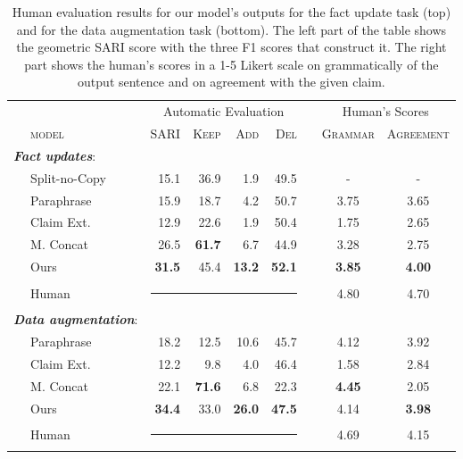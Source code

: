\documentclass[letterpaper]{article}
\begin{document}
\begin{table}[t]
\small
\centering
\begin{tabular}{llrrrrccc}
\toprule
& & \multicolumn{4}{c}{Automatic Evaluation} & & \multicolumn{2}{c}{Human's Scores}\\
\cmidrule(lr){3-6}\cmidrule(lr){8-9}
&\textsc{model}              & \textsc{SARI} & \textsc{Keep} & \textsc{Add} & \textsc{Del} & & \textsc{Grammar} & \textsc{Agreement} \\
\midrule
\multicolumn{2}{l}{\textit{\textbf{Fact updates}}:} &\\
&Split-no-Copy & 15.1 & 36.9 & 1.9 & 49.5 && - & -\\
&Paraphrase & 15.9 & 18.7 & 4.2 & 50.7 & & 3.75 & 3.65 \\
&Claim Ext.    & 12.9 & 22.6       & 1.9      & 50.4 & & 1.75 & 2.65     \\
&M. Concat     & 26.5 & \textbf{61.7}      & 6.7      & 44.9  & & 3.28 & 2.75 \\
&Ours & \textbf{31.5} & 45.4      & \textbf{13.2}      & \textbf{52.1}  & & \textbf{3.85} & \textbf{4.00} \\
&Human &\multicolumn{4}{r}{\rule[0.09cm]{4cm}{0.01cm}} & & 4.80 & 4.70 \\
\midrule

\multicolumn{2}{l}{\textit{\textbf{Data augmentation}}:} &\\
&Paraphrase & 18.2 & 12.5 & 10.6 & 45.7 & & 4.12 & 3.92 \\
&Claim Ext.    & 12.2 & 9.8       & 4.0      & 46.4  & & 1.58 & 2.84    \\
&M. Concat     & 22.1 & \textbf{71.6}      & 6.8      & 22.3  & & \textbf{4.45} & 2.05  \\
&Ours               & \textbf{34.4} & 33.0      & \textbf{26.0}     & \textbf{47.5}   & & 4.14 & \textbf{3.98}  \\
&Human &\multicolumn{4}{r}{\rule[0.09cm]{4cm}{0.01cm}} & & 4.69 & 4.15 \\


\bottomrule
\end{tabular}
\caption{Human evaluation results for our model's outputs for the fact update task (top) and for the data augmentation task (bottom).
The left part of the table shows the geometric SARI score with the three \textsc{F1} scores that construct it.
The right part shows the human's scores in a 1-5 Likert scale on grammatically of the output sentence and on agreement with the given claim.}\label{tab:symmetric_auto_res}

\end{table}
\end{document}
